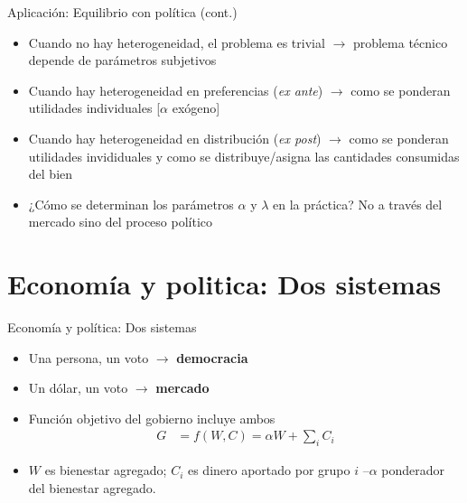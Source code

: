 \documentclass[14pt,aspectratio=169]{beamer}
\begin{document}
\begin{frame}{Aplicación: Equilibrio con política (cont.) }
  \begin{itemize}
    \item Cuando no hay heterogeneidad, el problema es trivial
      $\longrightarrow$ problema técnico depende de parámetros
      subjetivos
      \item Cuando hay heterogeneidad en preferencias (\textit{ex ante}) $\longrightarrow$ como se ponderan utilidades
      individuales [$\alpha$ exógeno]
      \item Cuando hay heterogeneidad en distribución (\textit{ex
          post}) $\longrightarrow$ como se
        ponderan utilidades invididuales y como se
        distribuye/asigna las cantidades consumidas del
        bien
        \item ¿Cómo se determinan los parámetros $\alpha$ y $\lambda$
          en la práctica? No a través del mercado sino del proceso político
  \end{itemize}

\end{frame}



\section{Economía y politica: Dos sistemas}


\begin{frame}{Economía y política: Dos sistemas}
  \begin{itemize}
    \item Una persona, un voto $\longrightarrow$ \textbf{democracia}
    \item Un dólar, un voto $\longrightarrow$ \textbf{mercado}
      \item Función objetivo del gobierno incluye ambos
      \begin{align}
        G&=f(W,C)=\alpha W+\sum_{i}C_{i}
        \end{align}
        \item $W$ es bienestar agregado; $C_{i}$ es dinero aportado por grupo $i$
      --$\alpha$ ponderador del bienestar agregado. 
  \end{itemize}

\end{frame}
\end{document}
